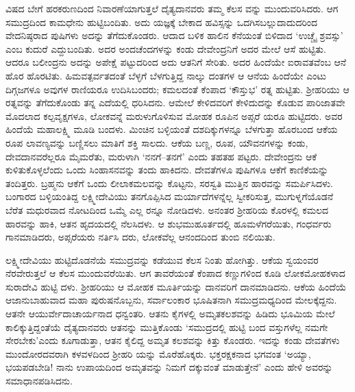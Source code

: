 ವಿಷದ ಬೇಗೆ ಹರಕರುಣದಿಂದ ನಿವಾರಣೆಯಾಗುತ್ತಲೆ ದೈತ್ಯದಾನವರು ತಮ್ಮ ಕೆಲಸ ವನ್ನು ಮುಂದುವರಿಸಿದರು. ಆಗ ಸಮುದ್ರದಿಂದ ಕಾಮಧೇನು ಹುಟ್ಟಿಬಂದಿತು. ಅದು ಯಜ್ಞಕ್ಕೆ ಬೇಕಾದ ಹವಿಸ್ಸನ್ನು ಒದಗಿಸಬಲ್ಲುದಾದುದರಿಂದ ವೇದನಿಷ್ಠರಾದ ಪುಷಿಗಳು ಅದನ್ನು ತೆಗೆದುಕೊಂಡರು. ಆದಾದ ಬಳಿಕ ಹಾಲಿನ ಕೆನೆಯಂತೆ ಬಿಳಿದಾದ ‘ಉಚ್ಚೈ ಶ್ರವಸ್ಸು’ ಎಂಬ ಕುದುರೆ ಎದ್ದುಬಂದಿತು. ಅದರ ಅಂದಚೆಂದಗಳನ್ನು ಕಂಡು ದೇವೇಂದ್ರನಿಗೆ ಅದರ ಮೇಲೆ ಆಸೆ ಹುಟ್ಟಿತು. ಆದರೂ ಬಲೀಂದ್ರನು ಅದನ್ನು ಅಪೇಕ್ಷೆ ಪಟ್ಟುದರಿಂದ ಅದು ಆತನಿಗೆ ಸೇರಿತು. ಅದರ ಹಿಂದೆಯೇ ಐರಾವತವೆಂಬ ಆನೆ ಹೊರ ಹೊರಟಿತು. ಹಿಮವತ್ಪರ್ವತದಂತೆ ಬೆಳ್ಳಗೆ ಬೆಳಗುತ್ತಿದ್ದ ನಾಲ್ಕು ದಂತಗಳ ಆ ಆನೆಯ ಹಿಂದೆಯೇ ಎಂಟು ದಿಗ್ಗಜಗಳೂ ಅವುಗಳ ರಾಣಿಯರೂ ಉದಿಸಿಬಂದರು; ಕಮಲದಂತೆ ಕೆಂಪಾದ ‘ಕೌಸ್ತುಭ’ ರತ್ನ ಹುಟ್ಟಿತು. ಶ್ರೀಹರಿಯು ಆ ರತ್ನವನ್ನು ತೆಗೆದುಕೊಂಡು ತನ್ನ ಎದೆಯಲ್ಲಿ ಧರಿಸಿದನು. ಆಮೇಲೆ ಕೇಳಿದವರಿಗೆ ಕೇಳಿದುದನ್ನು ಕೊಡುವ ಪಾರಿಜಾತವೇ ಮೊದಲಾದ ಕಲ್ಪವೃಕ್ಷಗಳೂ, ಲೋಕವನ್ನೆ ಮರುಳುಗೊಳಿಸುವ ಮೋಹಕ ರೂಪಿನ ಅಪ್ಸರೆ ಯರೂ ಹುಟ್ಟಿದರು. ಅವರ ಹಿಂದೆಯೆ ಮಹಾಲಕ್ಷ್ಮಿ ಮೂಡಿ ಬಂದಳು. ಮಿಂಚಿನ ಬಳ್ಳಿಯಂತೆ ದಶದಿಕ್ಕುಗಳನ್ನೂ ಬೆಳಗುತ್ತಾ ಹೊರಬಂದ ಆಕೆಯ ರೂಪ ಲಾವಣ್ಯವನ್ನು ಬಣ್ಣಿಸಲು ಮಾತಿಗೆ ಶಕ್ತಿ ಸಾಲದು. ಆಕೆಯ ಬಣ್ಣ, ರೂಪ, ಯೌವನಗಳನ್ನು ಕಂಡು, ದೇವದಾನವರೆಲ್ಲರೂ ಮೈಮರೆತು, ಮರುಳಾಗಿ ‘ನನಗೆ–ತನಗೆ’ ಎಂದು ತಹತಹ ಪಟ್ಟರು. ದೇವೇಂದ್ರನು ಆಕೆ ಕುಳಿತುಕೊಳ್ಳಲೆಂದು ಒಂದು ಸಿಂಹಾಸನವನ್ನು ತಂದು ಹಾಕಿದನು. ದೇವತೆಗಳೂ ಪುಷಿಗಳೂ ಆಕೆಗೆ ಕಾಣಿಕೆಯನ್ನು ತಂದಿತ್ತರು. ಬ್ರಹ್ಮನು ಆಕೆಗೆ ಒಂದು ಲೀಲಾಕಮಲವನ್ನು ಕೊಟ್ಟನು, ಸರಸ್ವತಿ ಮುತ್ತಿನ ಹಾರವನ್ನು ಸಮರ್ಪಿಸಿದಳು. ಬಂಗಾರದ ಬಳ್ಳಿಯಂತಿದ್ದ ಲಕ್ಷ್ಮೀದೇವಿಯು ತನಗೊಪ್ಪಿಸಿದ ಮರ್ಯಾದೆಗಳನ್ನೆಲ್ಲ ಸ್ವೀಕರಿಸುತ್ತ, ಮುಗುಳ್ನಗೆಯೊಡನೆ ಬೆರೆತ ಮಧುರವಾದ ನೋಟದಿಂದ ಒಮ್ಮೆ ಎಲ್ಲ ರನ್ನೂ ನೋಡಿದಳು. ಅನಂತರ ಶ್ರೀಹರಿಯ ಕೊರಳಲ್ಲಿ ಕಮಲದ ಹಾರವನ್ನು ಹಾಕಿ, ಆತನ ಹೃದಯದಲ್ಲಿ ನೆಲಸಿದಳು. ಆ ಶುಭಮುಹೂರ್ತದಲ್ಲಿ ಹೂಮಳೆಗರೆಯಿತು, ಗಂಧರ್ವರು ಗಾನಮಾಡಿದರು, ಅಪ್ಸರೆಯರು ನರ್ತಿಸಿ ದರು, ಲೋಕವೆಲ್ಲ ಆನಂದದಿಂದ ತುಂಬಿ ನಲಿಯಿತು. 

ಲಕ್ಷ್ಮೀದೇವಿಯು ಹುಟ್ಟಿದೊಡನೆಯೆ ಸಮುದ್ರವನ್ನು ಕಡೆಯುವ ಕೆಲಸ ನಿಂತು ಹೋಗಿತ್ತು. ಆಕೆಯ ಸ್ವಯಂವರ ನೆರವೇರುತ್ತಲೆ ಆ ಕೆಲಸ ಮುಂದುವರೆಯಿತು. ಆಗ ತಾವರೆಯಂತೆ ಕೆಂಪಾದ ಕಣ್ಣುಗಳಿಂದ ಕೂಡಿ ಲೋಕಮೋಹಕಳಾದ ಸುರಾದೇವಿ ಹುಟ್ಟಿ ದಳು. ಶ್ರೀಹರಿಯು ಆ ಮೋಹಕ ಮೂರ್ತಿಯನ್ನು ದಾನವರಿಗೆ ದಾನಮಾಡಿದನು. ಆಕೆಯ ಹಿಂದೆಯೆ ಆಜಾನುಬಾಹುವಾದ ಮಹಾ ಪುರುಷನೊಬ್ಬನು, ಸರ್ವಾಲಂಕಾರ ಭೂಷಿತನಾಗಿ ಸಮುದ್ರಮಧ್ಯದಿಂದ ಮೇಲಕ್ಕೆದ್ದನು. ಆತನೇ ಆಯುರ್ವೇದಾಚಾರ್ಯನಾದ ಧನ್ವಂತರಿ. ಆತನು ಕೈಗಳಲ್ಲಿ ಅಮೃತಕಲಶವನ್ನು ಹಿಡಿದು ಭೂಮಿಯ ಮೇಲೆ ಕಾಲಿಕ್ಕುತ್ತಿದ್ದಂತೆಯೆ ದೈತ್ಯದಾನವರು ಆತನನ್ನು ಮುತ್ತಿಕೊಂಡು ‘ಸಮುದ್ರದಲ್ಲಿ ಹುಟ್ಟಿ ಬಂದ ವಸ್ತುಗಳೆಲ್ಲ ನಮಗೇ ಸೇರಬೇಕು’ಎಂದು ಕೂಗಾಡುತ್ತಾ, ಆತನ ಕೈಲಿದ್ದ ಅಮೃತ ಕಲಶವನ್ನು ಕಿತ್ತು ಕೊಂಡರು. ಇದನ್ನು ಕಂಡು ದೇವತೆಗಳು ಮುಂದೋರದವರಾಗಿ ಕಳವಳದಿಂದ ಶ್ರೀಹರಿ ಯನ್ನು ಮೊರೆಹೊಕ್ಕರು. ಭಕ್ತರಕ್ಷಕನಾದ ಭಗವಂತ ‘ಅಯ್ಯಾ, ಭಯಪಡಬೇಡಿ! ನಾನು ಉಪಾಯದಿಂದ ಅಮೃತವನ್ನು ನಿಮಗೆ ದಕ್ಕುವಂತೆ ಮಾಡುತ್ತೇನೆ’ ಎಂದು ಹೇಳಿ ಅವರನ್ನು ಸಮಾಧಾನಪಡಿಸಿದನು.

